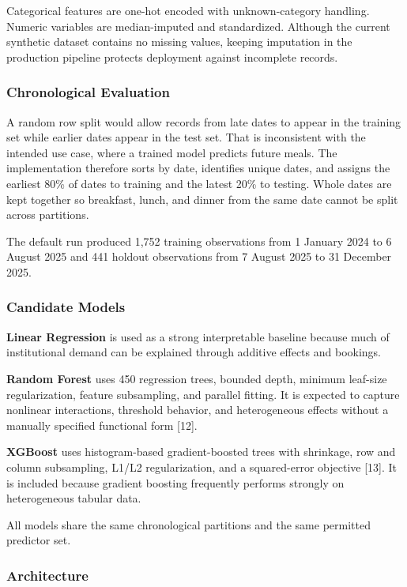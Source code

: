 \documentclass[conference]{IEEEtran}
\begin{document}
Categorical features are one-hot encoded with unknown-category handling.
Numeric variables are median-imputed and standardized. Although the
current synthetic dataset contains no missing values, keeping imputation
in the production pipeline protects deployment against incomplete
records.

\subsubsection{Chronological Evaluation}\label{chronological-evaluation}

A random row split would allow records from late dates to appear in the
training set while earlier dates appear in the test set. That is
inconsistent with the intended use case, where a trained model predicts
future meals. The implementation therefore sorts by date, identifies
unique dates, and assigns the earliest 80\% of dates to training and the
latest 20\% to testing. Whole dates are kept together so breakfast,
lunch, and dinner from the same date cannot be split across partitions.

The default run produced 1,752 training observations from 1 January 2024
to 6 August 2025 and 441 holdout observations from 7 August 2025 to 31
December 2025.

\subsubsection{Candidate Models}\label{candidate-models}

\textbf{Linear Regression} is used as a strong interpretable baseline
because much of institutional demand can be explained through additive
effects and bookings.

\textbf{Random Forest} uses 450 regression trees, bounded depth, minimum
leaf-size regularization, feature subsampling, and parallel fitting. It
is expected to capture nonlinear interactions, threshold behavior, and
heterogeneous effects without a manually specified functional form
{[}12{]}.

\textbf{XGBoost} uses histogram-based gradient-boosted trees with
shrinkage, row and column subsampling, L1/L2 regularization, and a
squared-error objective {[}13{]}. It is included because gradient
boosting frequently performs strongly on heterogeneous tabular data.

All models share the same chronological partitions and the same
permitted predictor set.

\subsubsection{Architecture}\label{architecture}
\end{document}
